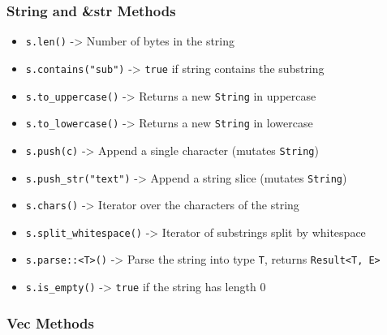 \documentclass[
  11pt,
]{article}
\providecommand{\tightlist}{%
  \setlength{\itemsep}{0pt}\setlength{\parskip}{0pt}}
\begin{document}
\subsubsection{String and \&str Methods}\label{string-and-str-methods}

\begin{itemize}
\tightlist
\item
  \texttt{s.len()} -\textgreater{} Number of bytes in the string
\item
  \texttt{s.contains("sub")} -\textgreater{} \texttt{true} if string
  contains the substring
\item
  \texttt{s.to\_uppercase()} -\textgreater{} Returns a new
  \texttt{String} in uppercase
\item
  \texttt{s.to\_lowercase()} -\textgreater{} Returns a new
  \texttt{String} in lowercase
\item
  \texttt{s.push(\textquotesingle{}c\textquotesingle{})} -\textgreater{}
  Append a single character (mutates \texttt{String})
\item
  \texttt{s.push\_str("text")} -\textgreater{} Append a string slice
  (mutates \texttt{String})
\item
  \texttt{s.chars()} -\textgreater{} Iterator over the characters of the
  string
\item
  \texttt{s.split\_whitespace()} -\textgreater{} Iterator of substrings
  split by whitespace
\item
  \texttt{s.parse::\textless{}T\textgreater{}()} -\textgreater{} Parse
  the string into type \texttt{T}, returns
  \texttt{Result\textless{}T,\ E\textgreater{}}
\item
  \texttt{s.is\_empty()} -\textgreater{} \texttt{true} if the string has
  length 0
\end{itemize}

\subsubsection{Vec Methods}\label{vec-methods}
\end{document}
